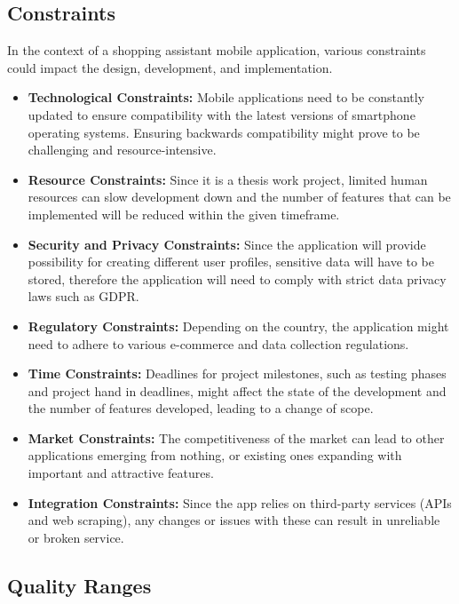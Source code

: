 \pagebreak

\subsection{Constraints}

In the context of a shopping assistant mobile application, various constraints could impact the design, development, and implementation.

\begin{itemize}
	\item \textbf{Technological Constraints:} Mobile applications need to be constantly updated to ensure compatibility with the latest versions of smartphone operating systems. Ensuring backwards compatibility might prove to be challenging and resource-intensive.
	\item \textbf{Resource Constraints:} Since it is a thesis work project, limited human resources can slow development down and the number of features that can be implemented will be reduced within the given timeframe.
	\item \textbf{Security and Privacy Constraints:} Since the application will provide possibility for creating different user profiles, sensitive data will have to be stored, therefore the application will need to comply with strict data privacy laws such as GDPR.
	\item \textbf{Regulatory Constraints:} Depending on the country, the application might need to adhere to various e-commerce and data collection regulations.
	\item \textbf{Time Constraints:} Deadlines for project milestones, such as testing phases and project hand in deadlines, might affect the state of the development and the number of features developed, leading to a change of scope.
	\item \textbf{Market Constraints:} The competitiveness of the market can lead to other applications emerging from nothing, or existing ones expanding with important and attractive features.
	\item \textbf{Integration Constraints:} Since the app relies on third-party services (APIs and web scraping), any changes or issues with these can result in unreliable or broken service.
\end{itemize}

\subsection{Quality Ranges}

